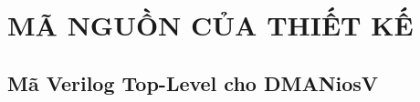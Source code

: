 \appendix

\chapter{MÃ NGUỒN CỦA THIẾT KẾ}
\label{Appendix1}

\section{Mã Verilog Top-Level cho DMANiosV}
\label{app:verilog_top} %

